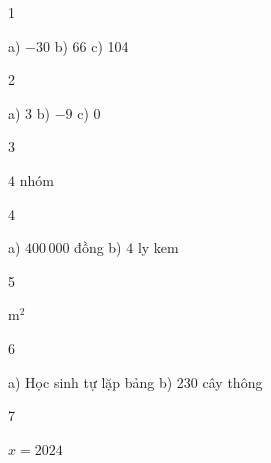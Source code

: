 \begin{Solbook}{1}
 \par \noindent a) $-30$ \hfill b) 66 \hfill c) 104 \hfill \qedEX 
\end{Solbook}
\begin{Solbook}{2}
 \par \noindent a) $3$ \hfill b) $-9$ \hfill c) 0 \hfill \qedEX 
\end{Solbook}
\begin{Solbook}{3}
 \par \noindent $4$ nhóm \hfill \qedEX 
\end{Solbook}
\begin{Solbook}{4}
 \par \noindent a) $400\,000$ đồng \hfill b) $4$ ly kem \hfill \qedEX 
\end{Solbook}
\begin{Solbook}{5}
 \par {} m$^2$ \hfill \qedEX 
\end{Solbook}
\begin{Solbook}{6}
 \par \noindent a) Học sinh tự lặp bảng \hfill b) 230 cây thông \hfill \qedEX 
\end{Solbook}
\begin{Solbook}{7}
 \par \noindent $x=2024$ \hfill \qedEX 
\end{Solbook}
